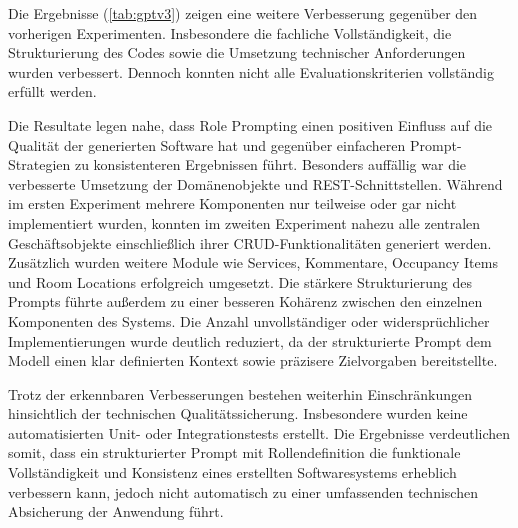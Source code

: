 Die Ergebnisse (\ref{tab:gptv3}) zeigen eine weitere Verbesserung gegenüber den vorherigen Experimenten. Insbesondere die fachliche Vollständigkeit, die Strukturierung des Codes sowie die Umsetzung technischer Anforderungen wurden verbessert. Dennoch konnten nicht alle Evaluationskriterien vollständig erfüllt werden.

Die Resultate legen nahe, dass Role Prompting einen positiven Einfluss auf die Qualität der generierten Software hat und gegenüber einfacheren Prompt-Strategien zu konsistenteren Ergebnissen führt. Besonders auffällig war die verbesserte Umsetzung der Domänenobjekte und REST-Schnittstellen. Während im ersten Experiment mehrere Komponenten nur teilweise oder gar nicht implementiert wurden, konnten im zweiten Experiment nahezu alle zentralen Geschäftsobjekte einschließlich ihrer CRUD-Funktionalitäten generiert werden. Zusätzlich wurden weitere Module wie Services, Kommentare, Occupancy Items und Room Locations erfolgreich umgesetzt.
Die stärkere Strukturierung des Prompts führte außerdem zu einer besseren Kohärenz zwischen den einzelnen Komponenten des Systems. Die Anzahl unvollständiger oder widersprüchlicher Implementierungen wurde deutlich reduziert, da der strukturierte Prompt dem Modell einen klar definierten Kontext sowie präzisere Zielvorgaben bereitstellte.

Trotz der erkennbaren Verbesserungen bestehen weiterhin Einschränkungen hinsichtlich der technischen Qualitätssicherung. Insbesondere wurden keine automatisierten Unit- oder Integrationstests erstellt. Die Ergebnisse verdeutlichen somit, dass ein strukturierter Prompt mit Rollendefinition die funktionale Vollständigkeit und Konsistenz eines erstellten Softwaresystems erheblich verbessern kann, jedoch nicht automatisch zu einer umfassenden technischen Absicherung der Anwendung führt.

